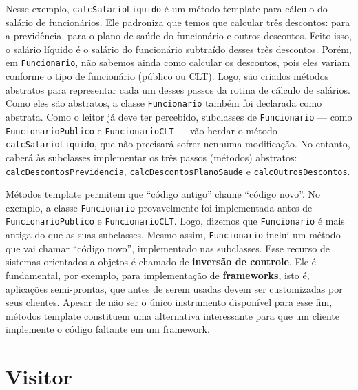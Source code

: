 \documentclass[
  11pt,
  twoside]{book}
\newcommand{\passthrough}[1]{#1}
\begin{document}
Nesse exemplo, \passthrough{\lstinline!calcSalarioLiquido!} é um método
template para cálculo do salário de funcionários. Ele padroniza que
temos que calcular três descontos: para a previdência, para o plano de
saúde do funcionário e outros descontos. Feito isso, o salário líquido é
o salário do funcionário subtraído desses três descontos. Porém, em
\passthrough{\lstinline!Funcionario!}, não sabemos ainda como calcular
os descontos, pois eles variam conforme o tipo de funcionário (público
ou CLT). Logo, são criados métodos abstratos para representar cada um
desses passos da rotina de cálculo de salários. Como eles são abstratos,
a classe \passthrough{\lstinline!Funcionario!} também foi declarada como
abstrata. Como o leitor já deve ter percebido, subclasses de
\passthrough{\lstinline!Funcionario!} --- como
\passthrough{\lstinline!FuncionarioPublico!} e
\passthrough{\lstinline!FuncionarioCLT!} --- vão herdar o método
\passthrough{\lstinline!calcSalarioLiquido!}, que não precisará sofrer
nenhuma modificação. No entanto, caberá às subclasses implementar os
três passos (métodos) abstratos:
\passthrough{\lstinline!calcDescontosPrevidencia!},
\passthrough{\lstinline!calcDescontosPlanoSaude!} e
\passthrough{\lstinline!calcOutrosDescontos!}.

  Métodos template
permitem que ``código antigo'' chame ``código novo''. No exemplo, a
classe \passthrough{\lstinline!Funcionario!} provavelmente foi
implementada antes de \passthrough{\lstinline!FuncionarioPublico!} e
\passthrough{\lstinline!FuncionarioCLT!}. Logo, dizemos que
\passthrough{\lstinline!Funcionario!} é mais antiga do que as suas
subclasses. Mesmo assim, \passthrough{\lstinline!Funcionario!} inclui um
método que vai chamar ``código novo'', implementado nas subclasses. Esse
recurso de sistemas orientados a objetos é chamado de \textbf{inversão
de controle}. Ele é fundamental, por exemplo, para implementação de
\textbf{frameworks}, isto é, aplicações semi-prontas, que antes de serem
usadas devem ser customizadas por seus clientes. Apesar de não ser o
único instrumento disponível para esse fim, métodos template constituem
uma alternativa interessante para que um cliente implemente o código
faltante em um framework.

\hypertarget{visitor}{%
\section{Visitor}\label{visitor}}

 
\end{document}
